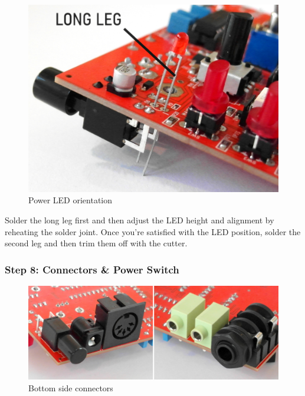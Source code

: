 \documentclass{scrartcl}
\begin{document}
\vspace{0.50cm}
\begin{figure}[!ht]
    \begin{center}
        \includegraphics[scale=0.35]{assets/pcb-led.jpg}
        \caption{Power LED orientation}
    \end{center}
\end{figure}

Solder the long leg first and then adjust the LED height and alignment by reheating the solder joint.
Once you're satisfied with the LED position, solder the second leg and then trim them off with the cutter.

\subsubsection{Step 8: Connectors \& Power Switch}

\begin{figure}[!ht]
    \begin{center}
        \includegraphics[scale=0.31]{assets/pcb-connectors.jpg}
        \caption{Bottom side connectors}
    \end{center}
\end{figure}
\end{document}
